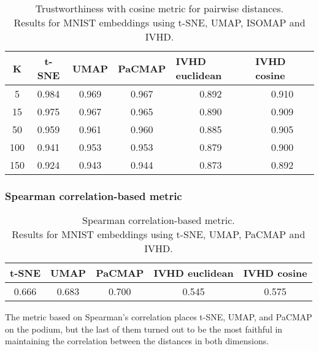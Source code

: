 \documentclass[12pt]{article}
\begin{document}
\begin{table}[h]
\centering
\caption{Trustworthiness with cosine metric for pairwise distances. \\
Results for MNIST embeddings using t-SNE, UMAP, ISOMAP and IVHD.}
\begin{tabular}{|c|c|c|c|c|c|}
\hline
\textbf{K} & \textbf{t-SNE} & \textbf{UMAP} & \multicolumn{1}{l|}{\textbf{PaCMAP}} & \multicolumn{1}{l|}{\textbf{IVHD euclidean}} & \multicolumn{1}{l|}{\textbf{IVHD cosine}} \\ \hline
5          & 0.984          & 0.969         & 0.967                                & 0.892                                        & 0.910                                     \\ \hline
15         & 0.975          & 0.967         & 0.965                                & 0.890                                        & 0.909                                     \\ \hline
50         & 0.959          & 0.961         & 0.960                                & 0.885                                        & 0.905                                     \\ \hline
100        & 0.941          & 0.953         & 0.953                                & 0.879                                        & 0.900                                     \\ \hline
150        & 0.924          & 0.943         & 0.944                                & 0.873                                        & 0.892                                     \\ \hline
\end{tabular}
\end{table}

\subsubsection{Spearman correlation-based metric}
\begin{table}[h]
\centering
\caption{Spearman correlation-based metric. \\ Results for MNIST embeddings using t-SNE, UMAP, PaCMAP and IVHD.}
\begin{tabular}{|c|c|l|l|l|}
\hline
\textbf{t-SNE} & \textbf{UMAP} & \textbf{PaCMAP}            & \textbf{IVHD euclidean}    & \textbf{IVHD cosine}       \\ \hline
0.666          & 0.683         & \multicolumn{1}{c|}{0.700} & \multicolumn{1}{c|}{0.545} & \multicolumn{1}{c|}{0.575} \\ \hline
\end{tabular}
\end{table}
The metric based on Spearman's correlation places t-SNE, UMAP, and PaCMAP on the podium, but the last of them turned out to be the most faithful in maintaining the correlation between the distances in both dimensions.
\end{document}
